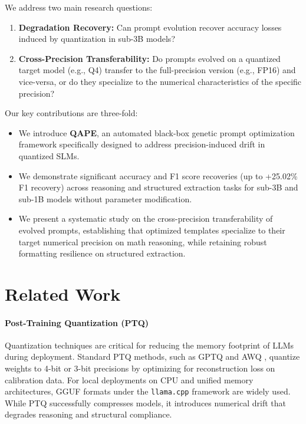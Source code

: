 \documentclass[11pt]{article}
\begin{document}
We address two main research questions:
\begin{enumerate}
    \item \textbf{Degradation Recovery:} Can prompt evolution recover accuracy losses induced by quantization in sub-3B models?
    \item \textbf{Cross-Precision Transferability:} Do prompts evolved on a quantized target model (e.g., Q4) transfer to the full-precision version (e.g., FP16) and vice-versa, or do they specialize to the numerical characteristics of the specific precision?
\end{enumerate}

Our key contributions are three-fold:
\begin{itemize}
    \item We introduce \textbf{QAPE}, an automated black-box genetic prompt optimization framework specifically designed to address precision-induced drift in quantized SLMs.
    \item We demonstrate significant accuracy and F1 score recoveries (up to +25.02\% F1 recovery) across reasoning and structured extraction tasks for sub-3B and sub-1B models without parameter modification.
    \item We present a systematic study on the cross-precision transferability of evolved prompts, establishing that optimized templates specialize to their target numerical precision on math reasoning, while retaining robust formatting resilience on structured extraction.
\end{itemize}

\section{Related Work}
\paragraph{Post-Training Quantization (PTQ)}
Quantization techniques are critical for reducing the memory footprint of LLMs during deployment. Standard PTQ methods, such as GPTQ \cite{frantar2022gptq} and AWQ \cite{lin2023awq}, quantize weights to 4-bit or 3-bit precisions by optimizing for reconstruction loss on calibration data. For local deployments on CPU and unified memory architectures, GGUF formats under the \texttt{llama.cpp} framework are widely used. While PTQ successfully compresses models, it introduces numerical drift that degrades reasoning and structural compliance.
\end{document}
